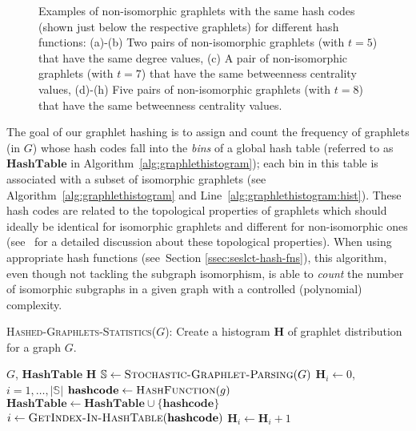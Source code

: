 \documentclass[journal]{IEEEtran}
\theoremstyle{definition}
\newcommand{\sect}[1]{Section \ref{#1}}
\newcommand{\alg}[1]{Algorithm~\ref{#1}}
\newcommand{\lin}[1]{Line~\ref{#1}}
\begin{document}
\begin{figure*}[!t]
\begin{center}
{\begin{tabular}{|cc|cc|cc|cc|}
\end{tabular}}
\end{center}
\caption{Examples of non-isomorphic graphlets with the same hash codes (shown just below the respective graphlets) for different hash functions: (a)-(b) Two pairs of non-isomorphic graphlets (with $t=5$) that have the same degree values, (c) A pair of non-isomorphic graphlets (with $t=7$) that have the same betweenness centrality values, (d)-(h) Five pairs of non-isomorphic graphlets (with $t=8$) that have the same betweenness centrality values.}
\label{fig:example-non-iso-same-hash-code}
\end{figure*}

The goal of our graphlet hashing is to assign and count the frequency of graphlets (in $G$) whose hash codes fall into the {\it bins} of a global hash table (referred to as $\mathbf{HashTable}$ in \alg{alg:graphlethistogram}); each bin in this table is associated with a subset of isomorphic graphlets (see \alg{alg:graphlethistogram} and \lin{alg:graphlethistogram:hist}). These hash codes are related to the topological properties of graphlets which should ideally be identical for isomorphic graphlets and different for non-isomorphic ones (see~\cite{Dahm2013} for a detailed discussion about these topological properties). When using appropriate hash functions (see~\sect{ssec:seslct-hash-fns}), this algorithm, even though not tackling the subgraph isomorphism, is able to {\it count} the number of isomorphic subgraphs in a given graph with a controlled (polynomial) complexity.
 
\begin{algorithm}
\caption{\textsc{Hashed-Graphlets-Statistics}($G$): Create a histogram $\mathbf{H}$ of graphlet distribution for a graph $G$.}
\label{alg:graphlethistogram}
\begin{algorithmic}[1]
\small
\REQUIRE $G$, $\mathbf{HashTable}$
\ENSURE $\mathbf{H}$
\STATE $\mathbb{S} \leftarrow \textsc{Stochastic-Graphlet-Parsing}(G)$
\STATE $\mathbf{H}_i\leftarrow 0$, $i=1,\dots,|\mathbb{S}|$
\STATE $\mathbf{hashcode} \leftarrow \textsc{HashFunction}(g)$\label{alg:graphlethistogram:hashcode}
\STATE $\mathbf{HashTable}\leftarrow \mathbf{HashTable} \cup \mathbf{\{hashcode\}} $
\ENDIF
\STATE $i \leftarrow \textsc{GetIndex-In-HashTable}(\mathbf{hashcode})$\label{alg:graphlethistogram:idx}
\STATE $\mathbf{H}_i \leftarrow \mathbf{H}_i + 1$\label{alg:graphlethistogram:hist}
\ENDFOR
\end{algorithmic}
\end{algorithm}
\end{document}
